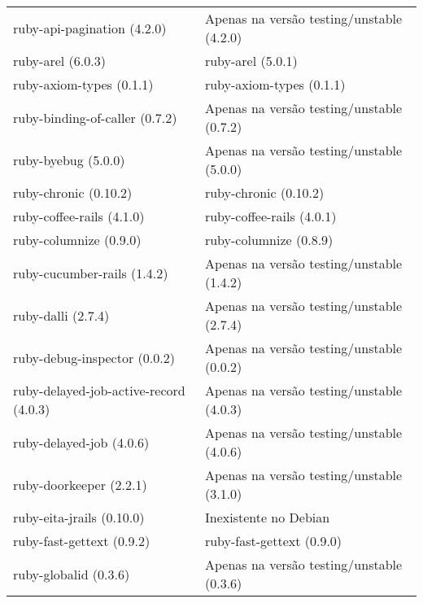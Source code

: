 \begin{table}[h]
\begin{tabular}{l|l}
         ruby-api-pagination (4.2.0)                     & Apenas na versão testing/unstable (4.2.0)  \\ 
        ruby-arel (6.0.3)                                & ruby-arel (5.0.1)                                                 \\ 
        ruby-axiom-types (0.1.1)                         & ruby-axiom-types (0.1.1)                                         \\ 
        ruby-binding-of-caller (0.7.2)                   & Apenas na versão testing/unstable (0.7.2)  \\ 
        ruby-byebug (5.0.0)                              & Apenas na versão testing/unstable (5.0.0)  \\ 
        ruby-chronic (0.10.2)                            & ruby-chronic (0.10.2)                                             \\ 
        ruby-coffee-rails (4.1.0)                        & ruby-coffee-rails (4.0.1)                                         \\ 
        ruby-columnize (0.9.0)                           & ruby-columnize (0.8.9)                                            \\ 
        ruby-cucumber-rails (1.4.2)                      & Apenas na versão testing/unstable (1.4.2)  \\ 
        ruby-dalli (2.7.4)                               & Apenas na versão testing/unstable (2.7.4)  \\ 
        ruby-debug-inspector (0.0.2)                     & Apenas na versão testing/unstable (0.0.2)  \\ 
         ruby-delayed-job-active-record (4.0.3)          & Apenas na versão testing/unstable (4.0.3)  \\ 
        ruby-delayed-job (4.0.6)                         & Apenas na versão testing/unstable (4.0.6)  \\ 
        ruby-doorkeeper (2.2.1)                          & Apenas na versão testing/unstable (3.1.0)  \\ 
        ruby-eita-jrails (0.10.0)                        & Inexistente no Debian                                             \\ 
        ruby-fast-gettext (0.9.2)                        & ruby-fast-gettext (0.9.0)                                         \\ 
        ruby-globalid (0.3.6)                            & Apenas na versão testing/unstable (0.3.6)  \\ 

\end{tabular}
\end{table}
